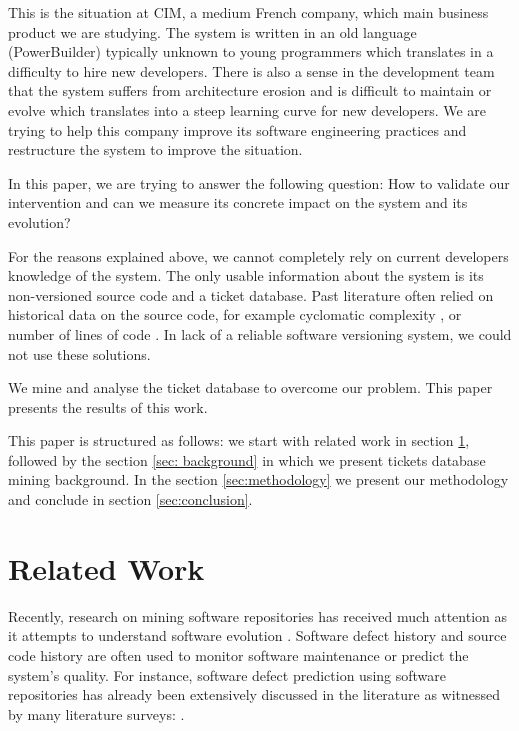 \documentclass[10pt,conference]{IEEEtran}
\begin{document}
This is the situation at CIM, a medium French company, which main business product we are studying.
The system is written in an old language (PowerBuilder) typically unknown to young programmers which translates in a difficulty to hire new developers.
There is also a sense in the development team that the system suffers from architecture erosion and is difficult to maintain or evolve which translates into a steep learning curve for new developers.
We are trying to help this company improve its software engineering practices and restructure the system to improve the situation.


In this paper, we are trying to answer the following question:
How to validate our intervention and can we measure its concrete impact on the system and its evolution?

For the reasons explained above, we cannot completely rely on current developers knowledge of the system.
The only usable information about the system is its non-versioned source code and a ticket database.
Past literature often relied on historical data on the source code, for example
cyclomatic complexity \cite{gill91}, or number of lines of code \cite{port18}.
In lack of a reliable software versioning system, we could not use these solutions.


We mine and analyse the ticket database to overcome our problem.
This paper presents the results of this work.

 This paper is structured as follows: we start with related work in section \ref{sec:related-work}, followed by the section \ref{sec: background} in which we present tickets database mining background. 
 In the section \ref{sec:methodology} we present our methodology and conclude in section \ref{sec:conclusion}.
 
\section{Related Work}
\label{sec:related-work}
Recently, research on mining software repositories has received much attention as it attempts to understand software evolution \cite{Zhan10a}.
Software defect history and source code history are often used to monitor software maintenance or predict the system's quality. 
For instance, software defect prediction using software repositories has already been extensively discussed in the literature as witnessed by many literature surveys: \cite{Catal09,Hall12,Hoss17,Li19a,malh15}.
\end{document}
